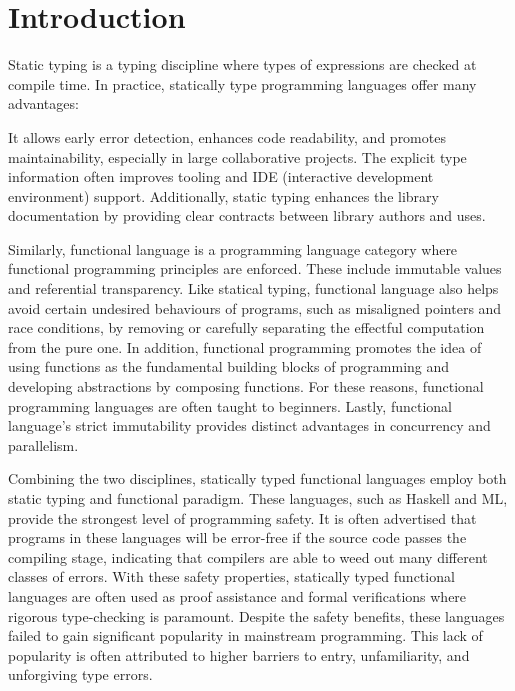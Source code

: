 
\chapter{Introduction}

\label{intro} 

\graphicspath{{Figures/Introduction}}

Static typing is a typing discipline where types of expressions are checked at compile time. In practice, statically type programming languages offer many advantages:

It allows early error detection, enhances code readability, and promotes maintainability, especially in large collaborative projects. The explicit type information often improves tooling and IDE (interactive development environment) support. Additionally, static typing enhances the library documentation by providing clear contracts between library authors and uses.

Similarly, functional language is a programming language category where functional programming principles are enforced. These include immutable values and referential transparency. Like statical typing, functional language also helps avoid certain undesired behaviours of programs, such as misaligned pointers and race conditions, by removing or carefully separating the effectful computation from the pure one. In addition, functional programming promotes the idea of using functions as the fundamental building blocks of programming and developing abstractions by composing functions. For these reasons, functional programming languages are often taught to beginners. Lastly, functional language's strict immutability provides distinct advantages in concurrency and parallelism.

Combining the two disciplines, statically typed functional languages employ both static typing and functional paradigm. These languages, such as Haskell and ML, provide the strongest level of programming safety. It is often advertised that programs in these languages will be error-free if the source code passes the compiling stage, indicating that compilers are able to weed out many different classes of errors. With these safety properties, statically typed functional languages are often used as proof assistance and formal verifications where rigorous type-checking is paramount. Despite the safety benefits, these languages failed to gain significant popularity in mainstream programming. This lack of popularity is often attributed to higher barriers to entry, unfamiliarity, and unforgiving type errors.

